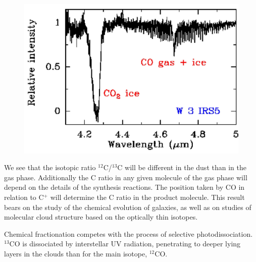 \begin{figure}
\includegraphics[width=12cm]{./B/vandishoeck_fig4_straight.jpg}
\end{figure}  \quad  We see that the isotopic ratio
$^{12}$C/$^{13}$C will be different in the dust than in the gas phase.
Additionally the C ratio in any given molecule of the gas phase will
depend on the details of the synthesis reactions. The position taken
by CO in relation to C$^+$ will determine the C ratio in the product
molecule. This result bears on the study of the chemical evolution of
galaxies, as well as on studies of molecular cloud structure based on
the optically thin isotopes.

Chemical fractionation competes with the process of selective
photodissociation.  $^{13}$CO is dissociated by interstellar UV
radiation, penetrating to deeper lying layers in the clouds than for
the main isotope, $^{12}$CO.






